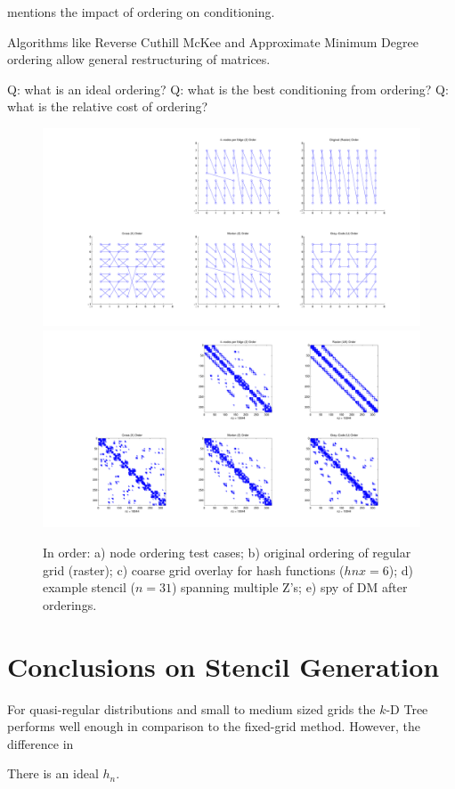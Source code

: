 \documentclass{report}
\begin{document}
\cite{Saad2003} mentions the impact of ordering on conditioning.

Algorithms like Reverse Cuthill McKee and Approximate Minimum Degree ordering allow general restructuring of matrices. 


Q: what is an ideal ordering?
Q: what is the best conditioning from ordering?
Q: what is the relative cost of ordering?


\begin{figure}
\centering
\includegraphics[width=\textwidth]{rbffd_methods_content/hashing/node_orderings-eps-converted-to.pdf} \\
\includegraphics[width=\textwidth]{rbffd_methods_content/hashing/spy_regulargrid-eps-converted-to.pdf} 
\caption{In order: a) node ordering test cases; b) original ordering of regular grid (raster); c) coarse grid overlay for hash functions ($hnx = 6$); d) example stencil ($n=31$) spanning multiple Z's; e) spy of DM after orderings.   }
\label{fig:orderings}
\end{figure}


\section{Conclusions on Stencil Generation}

For quasi-regular distributions and small to medium sized grids the $k$-D Tree performs well enough in comparison to the fixed-grid method. However, the difference in 

There is an ideal $h_n$. %


\ifstandalone


\end{document}
